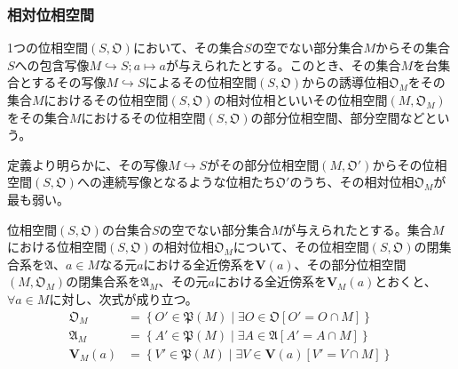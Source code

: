 \documentclass[dvipdfmx]{jsarticle}
\begin{document}
\subsubsection{相対位相空間}%
\begin{dfn}
1つの位相空間$\left( S,\mathfrak{O} \right)$において、その集合$S$の空でない部分集合$M$からその集合$S$への包含写像$M \hookrightarrow S;a \mapsto a$が与えられたとする。このとき、その集合$M$を台集合とするその写像$M \hookrightarrow S$によるその位相空間$\left( S,\mathfrak{O} \right)$からの誘導位相$\mathfrak{O}_{M}$をその集合$M$におけるその位相空間$\left( S,\mathfrak{O} \right)$の相対位相といいその位相空間$\left( M,\mathfrak{O}_{M} \right)$をその集合$M$におけるその位相空間$\left( S,\mathfrak{O} \right)$の部分位相空間、部分空間などという。
\end{dfn}\par
定義より明らかに、その写像$M \hookrightarrow S$がその部分位相空間$\left( M,\mathfrak{O}' \right)$からその位相空間$\left( S,\mathfrak{O} \right)$への連続写像となるような位相たち$\mathfrak{O}'$のうち、その相対位相$\mathfrak{O}_{M}$が最も弱い。
\begin{thm}\label{8.1.4.7}
位相空間$\left( S,\mathfrak{O} \right)$の台集合$S$の空でない部分集合$M$が与えられたとする。集合$M$における位相空間$\left( S,\mathfrak{O} \right)$の相対位相$\mathfrak{O}_{M}$について、その位相空間$\left( S,\mathfrak{O} \right)$の閉集合系を$\mathfrak{A}$、$a \in M$なる元$a$における全近傍系を$\mathbf{V}(a)$、その部分位相空間$\left( M,\mathfrak{O}_{M} \right)$の閉集合系を$\mathfrak{A}_{M}$、その元$a$における全近傍系を$\mathbf{V}_{M}(a)$とおくと、$\forall a \in M$に対し、次式が成り立つ。
\begin{align*}
\mathfrak{O}_{M} &= \left\{ O'\in \mathfrak{P}(M) \middle| \exists O \in \mathfrak{O}\left[ O' = O \cap M \right] \right\}\\
\mathfrak{A}_{M} &= \left\{ A'\in \mathfrak{P}(M) \middle| \exists A \in \mathfrak{A}\left[ A' = A \cap M \right] \right\}\\
\mathbf{V}_{M}(a) &= \left\{ V'\in \mathfrak{P}(M) \middle| \exists V \in \mathbf{V}(a)\left[ V' = V \cap M \right] \right\}
\end{align*}
\end{thm}
\end{document}

